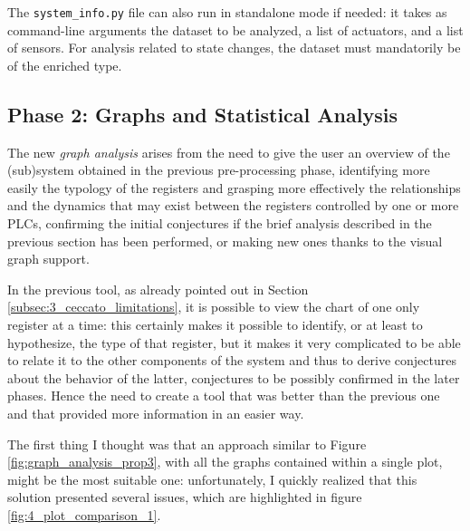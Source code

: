 \bigskip
The \texttt{system\_info.py} file can also run in standalone mode if needed: it takes as command-line arguments the dataset to be analyzed, a list of actuators, and a list of sensors. For analysis related to state changes, the dataset must mandatorily be of the enriched type.

\subsection{Phase 2: Graphs and Statistical Analysis}
\label{subsec:4_improve_graphs}

The new \textit{graph analysis} arises from the need to give the user an overview of the (sub)system obtained in the previous pre-processing phase, identifying more easily the typology of the registers and grasping more effectively the relationships and the dynamics that may exist between the registers controlled by one or more PLCs, confirming the initial conjectures if the brief analysis described in the previous section has been performed, or making new ones thanks to the visual graph support. 

\bigskip
In the previous tool, as already pointed out in Section \ref{subsec:3_ceccato_limitations}, it is possible to view the chart of one only register at a time: this certainly makes it possible to identify, or at least to hypothesize, the type of that register, but it makes it very complicated to be able to relate it to the other components of the system and thus to derive conjectures about the behavior of the latter, conjectures to be possibly confirmed in the later phases. Hence the need to create a tool that was better than the previous one and that provided more information in an easier way.

\bigskip
The first thing I thought was that an approach similar to Figure \ref{fig:graph_analysis_prop3}, with all the graphs contained within a single plot, might be the most suitable one: unfortunately, I quickly realized that this solution presented several issues, which are highlighted in figure \ref{fig:4_plot_comparison_1}. 


